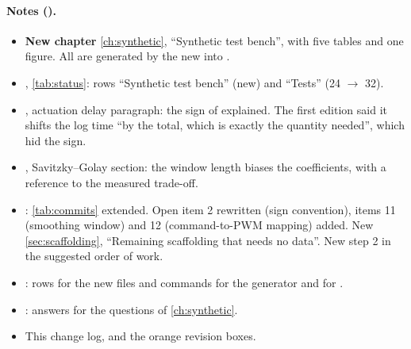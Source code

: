 \paragraph{Notes ().}
\begin{itemize}
  \item \textbf{New chapter} \cref{ch:synthetic}, ``Synthetic test bench'', with five tables and one
        figure. All are generated by the new  into
        .
  \item {}, \cref{tab:status}: rows ``Synthetic test bench'' (new) and ``Tests''
        (24 $\to$ 32).
  \item {}, actuation delay paragraph: the sign of  explained.
        The first edition said it shifts the log time ``by the total, which is exactly the
        quantity needed'', which hid the sign.
  \item {}, Savitzky--Golay section: the window length biases the
        coefficients, with a reference to the measured trade-off.
  \item {}: \cref{tab:commits} extended. Open item 2 rewritten (sign convention),
        items 11 (smoothing window) and 12 (command-to-PWM mapping) added. New
        \cref{sec:scaffolding}, ``Remaining scaffolding that needs no data''. New step 2 in the
        suggested order of work.
  \item {}: rows for the new files and commands for the generator and for
        .
  \item {}: answers for the questions of \cref{ch:synthetic}.
  \item This change log, and the orange revision boxes.
\end{itemize}
